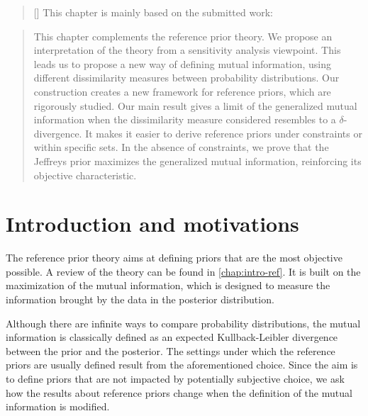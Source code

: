 
\begin{abstract}[\hspace*{-10pt}]
    This chapter is mainly based on the submitted work:   %
\end{abstract}

\begin{abstract}
    This chapter complements the reference prior theory. We propose an interpretation of the theory from a sensitivity analysis viewpoint. This leads us to propose a new way of defining mutual information, using different dissimilarity measures between probability distributions. 
    Our construction  creates a new framework for reference priors, which are rigorously studied.
    Our main result gives a limit of the generalized mutual information when the dissimilarity measure considered resembles to a $\delta$-divergence.
    It makes it easier to derive reference priors under constraints or within specific sets. In the absence of constraints, we prove that the Jeffreys prior maximizes the generalized mutual information, reinforcing its objective characteristic.
\end{abstract}

\minitoc

\section{Introduction and motivations}

The reference prior theory aims at defining priors that are the most objective possible. A review of the theory can be found in \cref{chap:intro-ref}. It is built on the maximization of the mutual information, which is designed to measure the information brought by the data in the posterior distribution.

Although there are infinite ways %
to compare probability distributions, the mutual information is classically defined as an expected Kullback-Leibler divergence between the prior and the posterior.
The settings under which the reference priors are usually defined result from the aforementioned choice. Since the aim is to define priors that are not impacted by potentially subjective choice, we ask how the results about reference priors change when the definition of the mutual information is modified.

